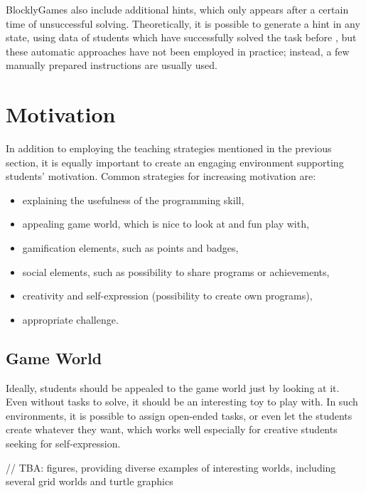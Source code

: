 \documentclass[
    digital,
    color,
    11pt,
    nocover,
    table,  %
    nolof,  %
    nolot,  %
    microtype,
]{fithesis3}
\begin{document}
BlocklyGames also include additional hints,
  which only appears after a certain time of unsuccessful solving.
Theoretically, it is possible to generate a hint in any state,
  using data of students which have successfully solved the task before
  \cite{generating-hints},
  but these automatic approaches have not been employed in practice;
  instead, a few manually prepared instructions are usually used.


\section{Motivation}
\label{sec:motivation}

In addition to employing the teaching strategies mentioned in the previous section,
  it is equally important to create an engaging environment supporting students’ motivation. Common strategies for increasing motivation are:

\begin{itemize}
\item explaining the usefulness of the programming skill,
\item appealing game world, which is nice to look at and fun play with,
\item gamification elements, such as points and badges,
\item social elements, such as possibility to share programs or achievements,
\item creativity and self-expression (possibility to create own programs),
\item appropriate challenge.
\end{itemize}


\subsection{Game World}
\label{sec:motivation.game-world}
Ideally, students should be appealed to the game world just by looking at it.
Even without tasks to solve,
  it should be an interesting toy to play with.
In such environments, it is possible to assign open-ended tasks,
  or even let the students create whatever they want,
  which works well especially for creative students seeking for self-expression.

// TBA: figures, providing diverse examples of interesting worlds, including several grid worlds and turtle graphics
\end{document}
